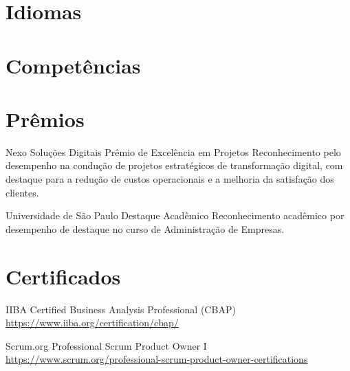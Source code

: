 \documentclass[a4paper, serif, 10pt]{moderncv}
\begin{document}
\section{Idiomas}

\section{Competências}

\section{Prêmios}

        {Nexo Soluções Digitais}
        {Prêmio de Excelência em Projetos}
        {}
        {}
        {Reconhecimento pelo desempenho na condução de projetos estratégicos de transformação digital, com destaque para a redução de custos operacionais e a melhoria da satisfação dos clientes.}

        {Universidade de São Paulo}
        {Destaque Acadêmico}
        {}
        {}
        {Reconhecimento acadêmico por desempenho de destaque no curso de Administração de Empresas.}
\section{Certificados}

        {IIBA}
        {Certified Business Analysis Professional (CBAP)}
        {\url{https://www.iiba.org/certification/cbap/}}
        {}
        {}

        {Scrum.org}
        {Professional Scrum Product Owner I}
        {\url{https://www.scrum.org/professional-scrum-product-owner-certifications}}
        {}
        {}
\end{document}
